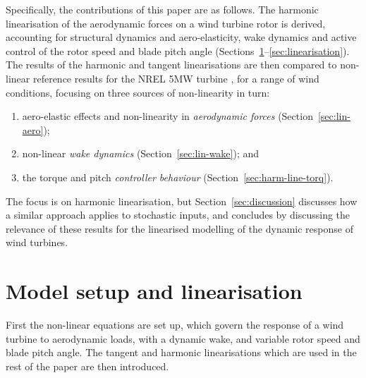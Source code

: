 \documentclass[a4paper,preprint]{elsarticle}
\begin{document}
Specifically, the contributions of this paper are as follows. The harmonic
linearisation of the aerodynamic forces on a wind turbine rotor is derived,
accounting for structural dynamics and aero-elasticity, wake dynamics and active
control of the rotor speed and blade pitch angle
(Sections~\ref{sec:lin-general}--\ref{sec:linearisation}). The results of the
harmonic and tangent linearisations are then compared to non-linear reference
results for the NREL 5MW turbine \citep{Jonkman2009b}, for a range of wind
conditions, focusing on three sources of non-linearity in turn:
\begin{enumerate}
\item aero-elastic effects and non-linearity in \textit{aerodynamic forces}
  (Section~\ref{sec:lin-aero});
\item non-linear \textit{wake dynamics} (Section~\ref{sec:lin-wake}); and
\item the torque and pitch \textit{controller behaviour}
  (Section~\ref{sec:harm-line-torq}).
\end{enumerate}
The focus is on harmonic linearisation, but Section~\ref{sec:discussion}
discusses how a similar approach applies to stochastic inputs, and concludes by
discussing the relevance of these results for the linearised modelling of the
dynamic response of wind turbines.

\section{Model setup and linearisation}
\label{sec:lin-general}

First the non-linear equations are set up, which govern the response of a wind
turbine to aerodynamic loads, with a dynamic wake, and variable rotor speed and
blade pitch angle. The tangent and harmonic linearisations which are used in the
rest of the paper are then introduced.
\end{document}
